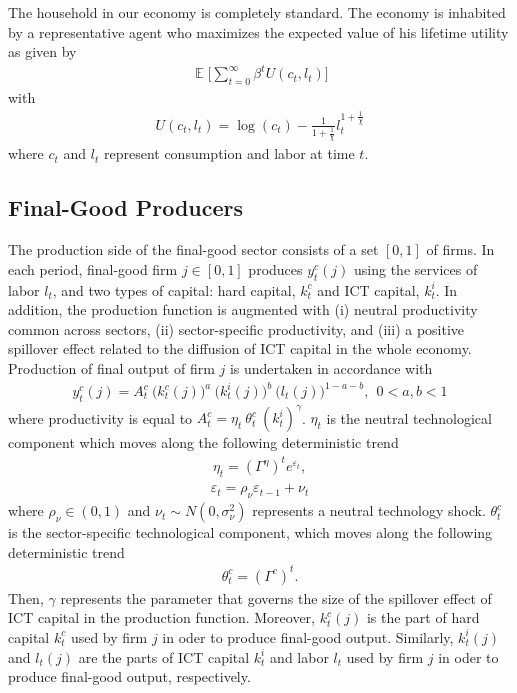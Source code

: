 \documentclass[12pt]{article}
\DeclareMathOperator{\E}{\mathbb{E}}
\begin{document}
The household in our economy is completely standard. The economy is inhabited by a representative agent who maximizes the expected value of his lifetime utility as given by
\begin{eqnarray}\label{equation:utilFunc}
\E \Bigg[  \sum_{t=0}^{\infty} \beta^t U(c_t,l_t)  \Bigg]
\end{eqnarray}
with 
\begin{eqnarray*}
U(c_t,l_t) = \log(c_t) - \frac{1}{1+\frac{1}{\chi}} l_t^{1+\frac{1}{\chi}}
\end{eqnarray*}
where $c_t$ and $l_t$ represent consumption and labor at time $t$. 

\subsection{Final-Good Producers}

The production side of the final-good sector consists of a set $[0,1]$ of firms. In each period, final-good firm $j \in [0,1]$ produces $y^c_t(j)$ using the services of labor $l_{t}$, and two types of capital: hard capital, $k^c_{t}$ and ICT capital, $k^i_{t}$. In addition, the production function is augmented with (i) neutral productivity common across sectors, (ii) sector-specific productivity, and (iii) a positive spillover effect related to the diffusion of ICT capital in the whole economy. Production of final output of firm $j$ is undertaken in accordance with
\begin{eqnarray}\label{equation:production_FINAL}
y^c_t(j) = A^c_t \ \big( k^c_{t}(j) \big)^a \ \big( k^i_{t}(j) \big)^b \ \big( l_{t}(j) \big)^{1-a-b}, \ \ 0 < a,b < 1
\end{eqnarray}
where productivity is equal to $ A_t^c = \eta_t \ \theta^c_t \ (k^i_{t})^{\gamma} $. $\eta_t$ is the neutral technological component which moves along the following deterministic trend
\begin{eqnarray}\label{equation:neutral_tech_process}
\eta_t = (\Gamma^{\eta})^t e^{\varepsilon_t},  
\end{eqnarray} 
\begin{eqnarray}\label{equation:neutral_tech_shock}
 \varepsilon_t = \rho_{\nu} \varepsilon_{t-1} + \nu_t
\end{eqnarray} 
where $\rho_{\nu} \in (0,1)$ and $\nu_t \sim N(0,\sigma_{\nu}^2)$ represents a neutral technology shock. $\theta^c_t$ is the sector-specific technological component,  which moves along the following deterministic trend
\begin{eqnarray}
\theta_t^c = (\Gamma^{c})^t.
\end{eqnarray} 
Then, $\gamma$ represents the parameter that governs the size of the spillover effect of ICT capital in the production function. Moreover, $k^c_{t}(j)$ is the part of hard capital $k^c_t$ used by firm $j$ in oder to produce final-good output. Similarly, $k^i_{t}(j)$ and $l_{t}(j)$ are the parts of ICT capital $k^i_t$ and labor $l_t$ used by firm $j$ in oder to produce final-good output, respectively. 
\end{document}
